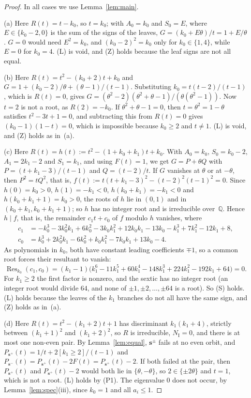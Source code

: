 \documentclass[11pt]{article}
\numberwithin{equation}{section}
\theoremstyle{remark}
\newcommand{\Q}{\mathbb Q}
\newcommand{\s}{\mathbf s}
\newcommand{\NI}{N_{\mathrm I}}
\begin{document}
\begin{proof}
In all cases we use Lemma~\ref{lem:main}.

(a) Here $R(t)=t-k_0$, so $t=k_0$; with $A_0=k_0$ and $S_0=E$, where
$E\in\{k_0-2,0\}$ is the sum of the signs of the leaves, $G=(k_0+E\theta)/t=1+E/\theta$. $G=0$ would need
$E^2=k_0$, and $(k_0-2)^2=k_0$ only for $k_0\in\{1,4\}$, while $E=0$ for
$k_0=4$. (L) is void, and (Z)
holds because the leaf signs are not all equal.

(b) Here $R(t)=t^2-(k_0+2)t+k_0$ and
$G=1+(k_0-2)/\theta+(\theta-1)/(t-1)$. Substituting $k_0=t(t-2)/(t-1)$, which
is $R(t)=0$, gives
$G=(\theta^2-2)(\theta^2+\theta-1)/(\theta(\theta^2-1))$. Now $t=2$ is not a
root, as $R(2)=-k_0$. If $\theta^2+\theta-1=0$, then $t=\theta^2=1-\theta$
satisfies $t^2-3t+1=0$, and subtracting this from $R(t)=0$ gives
$(k_0-1)(1-t)=0$, which is impossible because $k_0\ge2$ and $t\ne1$. (L) is void, and (Z) holds as in~(a).

(c) Here $R(t)=h(t):=t^2-(1+k_0+k_1)t+k_0$. With $A_0=k_0$, $S_0=k_0-2$,
$A_1=2k_1-2$ and $S_1=k_1$, and using $F(t)=1$, we get $G=P+\theta Q$ with
$P=(t+k_1-3)/(t-1)$ and $Q=(t-2)/t$. If $G$ vanishes at $\theta$ or at
$-\theta$, then $P^2=tQ^2$, that is,
$f(t):=t(t+k_1-3)^2-(t-2)^2(t-1)^2=0$. Since $h(0)=k_0>0$, $h(1)=-k_1<0$,
$h(k_0+k_1)=-k_1<0$ and $h(k_0+k_1+1)=k_0>0$, the roots of $h$ lie in $(0,1)$
and in $(k_0+k_1,k_0+k_1+1)$; so $h$ has no integer root and is irreducible
over~$\Q$. Hence $h\mid f$, that is, the remainder $c_1t+c_0$ of $f$ modulo
$h$ vanishes, where
\begin{align*}
 c_1&=-k_0^3-3k_0^2k_1+6k_0^2-3k_0k_1^2+12k_0k_1-13k_0-k_1^3+7k_1^2-12k_1+8,\\
 c_0&=k_0^3+2k_0^2k_1-6k_0^2+k_0k_1^2-7k_0k_1+13k_0-4 .
\end{align*}
As polynomials in $k_0$, both have constant leading coefficients $\mp1$, so a
common root forces their resultant to vanish:
\[
 \operatorname{Res}_{k_0}(c_1,c_0)=(k_1-1)\bigl(k_1^6-11k_1^5+60k_1^4-148k_1^3
 +224k_1^2-192k_1+64\bigr)=0 .
\]
For $k_1\ge2$ the first factor is nonzero, and the sextic has no integer root
(an integer root would divide $64$, and none of $\pm1,\pm2,\dots,\pm64$ is a
root). So (S) holds. (L) holds because the leaves of the $k_1$ branches do not
all have the same sign, and (Z) holds as in~(a).

(d) Here $R(t)=t^2-(k_1+2)t+1$ has discriminant $k_1(k_1+4)$, strictly between
$(k_1+1)^2$ and $(k_1+2)^2$, so $R$ is irreducible, $\NI=0$, and there is at most
one non-even pair. By Lemma~\ref{lem:equal}, $\s^{\pm}$ fails at no even orbit,
and $P_{\s^+}(t)=1/t+2[k_1\ge2]/(t-1)$ and $P_{\s^-}(t)=P_{\s^+}(t)-2F(t)=
P_{\s^+}(t)-2$. If both failed at the pair, then $P_{\s^+}(t)$ and
$P_{\s^+}(t)-2$ would both lie in $\{\theta,-\theta\}$, so $2\in\{\pm2\theta\}$
and $t=1$, which is not a root. (L) holds by (P1). The eigenvalue $0$ does not
occur, by Lemma~\ref{lem:spec}(iii), since $k_0=1$ and all $a_i\le1$.


\end{proof}
\end{document}
